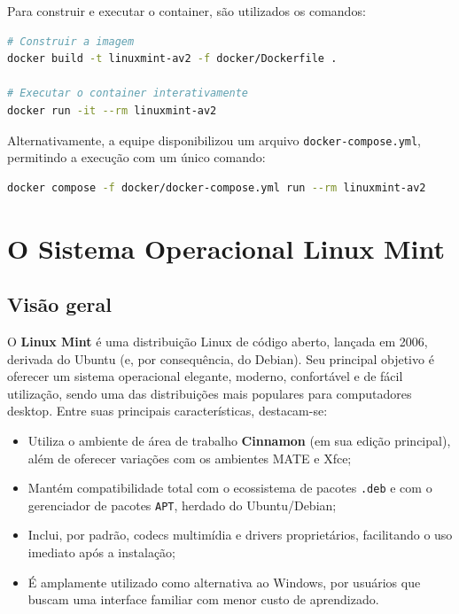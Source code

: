 \documentclass[a4paper,12pt]{article}
\begin{document}
Para construir e executar o container, são utilizados os comandos:

\begin{lstlisting}[language=bash, caption={Construção e execução do container}]
# Construir a imagem
docker build -t linuxmint-av2 -f docker/Dockerfile .

# Executar o container interativamente
docker run -it --rm linuxmint-av2
\end{lstlisting}

Alternativamente, a equipe disponibilizou um arquivo
\texttt{docker-compose.yml}, permitindo a execução com um único comando:

\begin{lstlisting}[language=bash, caption={Execução via Docker Compose}]
docker compose -f docker/docker-compose.yml run --rm linuxmint-av2
\end{lstlisting}


\section{O Sistema Operacional Linux Mint}

\subsection{Visão geral}

O \textbf{Linux Mint} é uma distribuição Linux de código aberto, lançada em
2006, derivada do Ubuntu (e, por consequência, do Debian). Seu principal
objetivo é oferecer um sistema operacional elegante, moderno, confortável e
de fácil utilização, sendo uma das distribuições mais populares para
computadores desktop. Entre suas principais características, destacam-se:

\begin{itemize}
    \item Utiliza o ambiente de área de trabalho \textbf{Cinnamon} (em sua
          edição principal), além de oferecer variações com os ambientes
          MATE e Xfce;
    \item Mantém compatibilidade total com o ecossistema de pacotes
          \texttt{.deb} e com o gerenciador de pacotes \texttt{APT},
          herdado do Ubuntu/Debian;
    \item Inclui, por padrão, codecs multimídia e drivers proprietários,
          facilitando o uso imediato após a instalação;
    \item É amplamente utilizado como alternativa ao Windows, por usuários
          que buscam uma interface familiar com menor custo de
          aprendizado.
\end{itemize}
\end{document}
